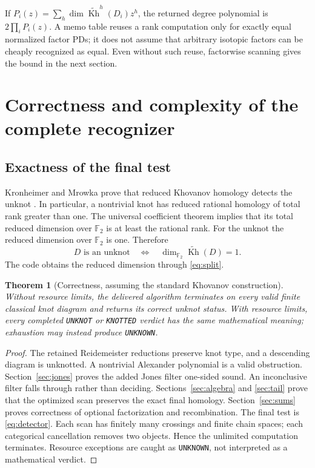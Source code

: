 \documentclass[11pt]{article}
\newtheorem{theorem}{Theorem}[section]
\theoremstyle{remark}\newtheorem{remark}[theorem]{Remark}
\newcommand{\F}{\mathbb F}
\newcommand{\rKh}{\widetilde{\operatorname{Kh}}}
\begin{document}
If $P_i(z)=\sum_h\dim\rKh^h(D_i)z^h$, the returned degree polynomial is
$2\prod_iP_i(z)$. A memo table reuses a rank computation only for exactly
equal normalized factor PDs; it does not assume that arbitrary isotopic
factors can be cheaply recognized as equal. Even without such reuse,
factorwise scanning gives the bound in the next section.

\section{Correctness and complexity of the complete recognizer}
\subsection{Exactness of the final test}
Kronheimer and Mrowka prove that reduced Khovanov homology detects the
unknot \cite{KM}. In particular, a nontrivial knot has reduced rational
homology of total rank greater than one. The universal coefficient theorem
implies that its total reduced dimension over $\F_2$ is at least the rational
rank. For the unknot the reduced dimension over $\F_2$ is one. Therefore
\begin{equation}\label{eq:detector}
       D\text{ is an unknot}\quad\Longleftrightarrow\quad
       \dim_{\F_2}\rKh(D)=1.
\end{equation}
The code obtains the reduced dimension through \eqref{eq:split}.

\begin{theorem}[Correctness, assuming the standard Khovanov construction]
Without resource limits, the delivered algorithm terminates on every valid
finite classical knot diagram and returns its correct unknot status.
With resource limits, every completed \texttt{UNKNOT} or \texttt{KNOTTED}
verdict has the same mathematical meaning; exhaustion may instead produce
\texttt{UNKNOWN}.
\end{theorem}
\begin{proof}
The retained Reidemeister reductions preserve knot type, and a descending
diagram is unknotted. A nontrivial Alexander polynomial is a valid
obstruction. Section~\ref{sec:jones} proves the added Jones filter one-sided
sound. An inconclusive filter falls through rather than deciding.
Sections~\ref{sec:algebra} and \ref{sec:tail} prove that the optimized scan
preserves the exact final homology. Section~\ref{sec:sums} proves correctness
of optional factorization and recombination. The final test is
\eqref{eq:detector}. Each scan has finitely many crossings and finite chain
spaces; each categorical cancellation removes two objects. Hence the
unlimited computation terminates. Resource exceptions are caught as
\texttt{UNKNOWN}, not interpreted as a mathematical verdict.
\end{proof}
\end{document}
